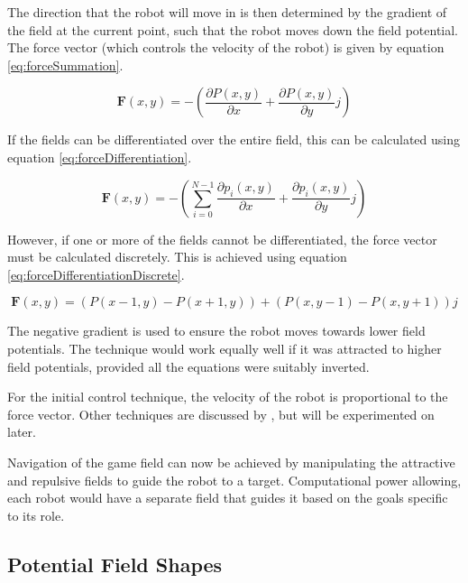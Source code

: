 \documentclass[10pt]{article}
\begin{document}
The direction that the robot will move in is then determined by the gradient of
the field at the current point, such that the robot moves down the field
potential. The force vector (which controls the velocity of the robot) is given
by equation \ref{eq:forceSummation}.

\begin{equation}
\boldsymbol{F}(x,y)=-\left(\frac{{\partial P\left(x,y\right)}}{\partial x}+\frac{{\partial P\left(x,y\right)}}{\partial y}j\right)\label{eq:forceSummation}
\end{equation}

If the fields can be differentiated over the entire field, this can be
calculated using equation \ref{eq:forceDifferentiation}.

\begin{equation}
\boldsymbol{F}(x,y)=-\left(\sum_{i=0}^{N-1}\frac{\partial p_{i}\left(x,y\right)}{\partial x}+\frac{\partial p_{i}\left(x,y\right)}{\partial y}j\right)
\label{eq:forceDifferentiation}
\end{equation}

However, if one or more of the fields cannot be differentiated, the force vector
must be calculated discretely. This is achieved using equation
\ref{eq:forceDifferentiationDiscrete}.

\begin{equation}
\boldsymbol{F}(x,y)=\left(P\left(x-1,y\right)-P\left(x+1,y\right)\right)+\left(P\left(x,y-1\right)-P\left(x,y+1\right)\right)j
\label{eq:forceDifferentiationDiscrete}
\end{equation}

The negative gradient is used to ensure the robot moves towards lower field
potentials. The technique would work equally well if it was attracted to higher
field potentials, provided all the equations were suitably inverted.

For the initial control technique, the velocity of the robot is proportional to
the force vector. Other techniques are discussed by
\cite{intelligentAlgorithmPathPlanning}, but will be experimented on later.

Navigation of the game field can now be achieved by manipulating the attractive
and repulsive fields to guide the robot to a target. Computational power
allowing, each robot would have a separate field that guides it based on the
goals specific to its role.

\subsection{Potential Field Shapes}
\end{document}
